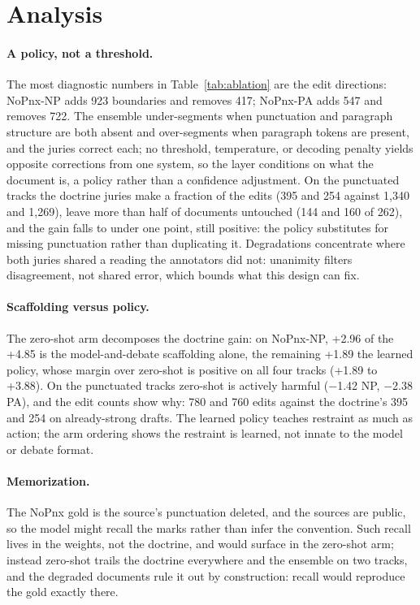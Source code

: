 \documentclass[11pt]{article}
\begin{document}
\section{Analysis}
\label{sec:analysis}
\paragraph{A policy, not a threshold.}
The most diagnostic numbers in Table~\ref{tab:ablation} are the edit directions:
NoPnx-NP adds 923 boundaries and removes 417; NoPnx-PA adds 547 and removes 722. The ensemble under-segments when punctuation and paragraph structure are
both absent and over-segments when paragraph tokens are present, and the juries
correct each; no threshold, temperature, or decoding penalty yields opposite
corrections from one system, so the layer conditions on what the document is, a
policy rather than a confidence adjustment.
On the punctuated tracks the doctrine juries make a fraction of the edits (395 and
254 against 1{,}340 and 1{,}269), leave more than half of documents untouched (144
and 160 of 262), and the gain falls to under one point, still positive: the policy
substitutes for missing punctuation rather than duplicating it. Degradations concentrate where both juries shared a reading the
annotators did not: unanimity filters disagreement, not shared error, which bounds
what this design can fix.
\paragraph{Scaffolding versus policy.} The zero-shot arm decomposes the doctrine
gain: on NoPnx-NP, +2.96 of the +4.85 is the model-and-debate scaffolding alone, the
remaining +1.89 the learned policy, whose margin over zero-shot is positive on all
four tracks (+1.89 to +3.88).
On the punctuated tracks zero-shot is actively harmful ($-$1.42 NP, $-$2.38 PA), and
the edit counts show why: 780 and 760 edits against the doctrine's 395 and 254 on
already-strong drafts. The learned policy teaches restraint as much as action; the arm
ordering shows the restraint is learned, not innate to the model or debate format.
\paragraph{Memorization.} The NoPnx gold is the source's punctuation deleted,
and the sources are public, so the model might recall the marks rather than infer the
convention. Such recall lives in the weights, not the doctrine, and would surface in
the zero-shot arm; instead zero-shot trails the doctrine everywhere and the ensemble
on two tracks, and the degraded documents rule it out by construction: recall would
reproduce the gold exactly there.
\end{document}
